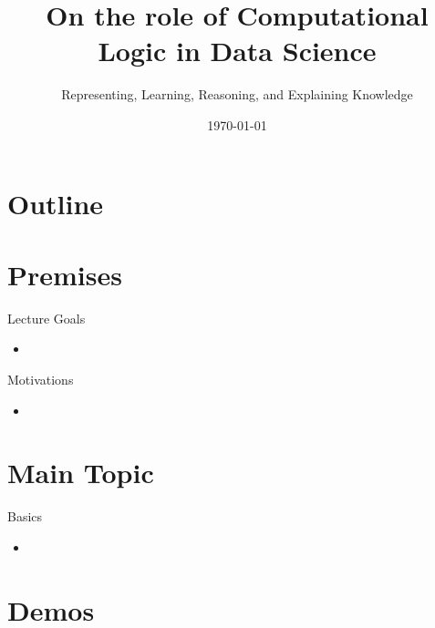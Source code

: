 \documentclass[presentation]{beamer}\mode<presentation>{\usetheme{AMSBolognaFC}}
\title[Role of CL in DS]{On the role of Computational Logic in Data Science}
\subtitle{Representing, Learning, Reasoning, and Explaining Knowledge}
\date{\today}
\begin{document}

\frame{\titlepage}

\section*{Outline}
%
\frame[c]{\tableofcontents[hideallsubsections]}

\section{Premises}

\begin{frame}{Lecture Goals}
	\begin{itemize}
		\item
	\end{itemize}
\end{frame}

\begin{frame}{Motivations}
	\begin{itemize}
		\item
	\end{itemize}
\end{frame}

\section{Main Topic}

\begin{frame}{Basics}
	\begin{itemize}
		\item
	\end{itemize}
\end{frame}

\section{Demos}
\end{document}
